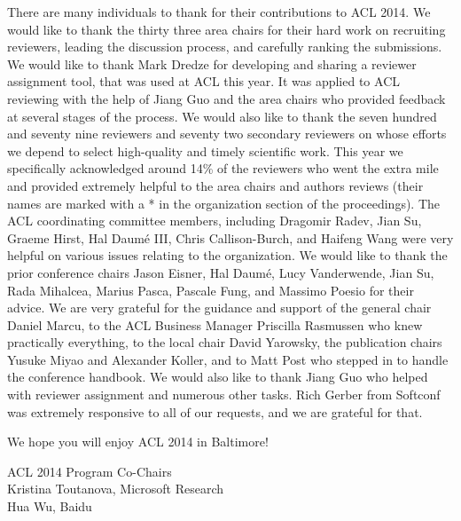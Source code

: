 There are many individuals to thank for their contributions to ACL
2014. We would like to thank the thirty three area chairs for their
hard work on recruiting reviewers, leading the discussion process, and
carefully ranking the submissions.  We would like to thank Mark Dredze
for developing and sharing a reviewer assignment tool, that was used
at ACL this year. It was applied to ACL reviewing with the help of
Jiang Guo and the area chairs who provided feedback at several stages
of the process. We would also like to thank the seven hundred and
seventy nine reviewers and seventy two secondary reviewers on whose
efforts we depend to select high-quality and timely scientific
work. This year we specifically acknowledged around 14\% of the
reviewers who went the extra mile and provided extremely helpful to
the area chairs and authors reviews (their names are marked with a *
in the organization section of the proceedings). The ACL coordinating
committee members, including Dragomir Radev, Jian Su, Graeme Hirst,
Hal Daum\'{e} III, Chris Callison-Burch, and Haifeng Wang were very
helpful on various issues relating to the organization.  We would like
to thank the prior conference chairs Jason Eisner, Hal Daum\'{e}, Lucy
Vanderwende, Jian Su, Rada Mihalcea, Marius Pasca, Pascale Fung, and
Massimo Poesio for their advice. We are very grateful for the guidance
and support of the general chair Daniel Marcu, to the ACL Business
Manager Priscilla Rasmussen who knew practically everything, to the
local chair David Yarowsky, the publication chairs Yusuke Miyao and
Alexander Koller, and to Matt Post who stepped in to handle the
conference handbook. We would also like to thank Jiang Guo who helped
with reviewer assignment and numerous other tasks. Rich Gerber from
Softconf was extremely responsive to all of our requests, and we are
grateful for that.

We hope you will enjoy ACL 2014 in Baltimore!

\vspace{.2in}
ACL 2014 Program Co-Chairs\\
\indent Kristina Toutanova, Microsoft Research\\
\indent Hua Wu, Baidu

